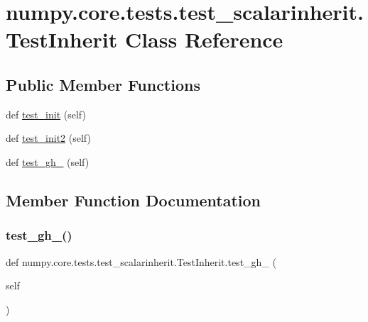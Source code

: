 \hypertarget{classnumpy_1_1core_1_1tests_1_1test__scalarinherit_1_1TestInherit}{}\section{numpy.\+core.\+tests.\+test\+\_\+scalarinherit.\+Test\+Inherit Class Reference}
\label{classnumpy_1_1core_1_1tests_1_1test__scalarinherit_1_1TestInherit}
\subsection*{Public Member Functions}
\begin{DoxyCompactItemize}
\item 
def \hyperlink{classnumpy_1_1core_1_1tests_1_1test__scalarinherit_1_1TestInherit_a812e7477531e852af7a5ef3efe48aa0d}{test\+\_\+init} (self)
\item 
def \hyperlink{classnumpy_1_1core_1_1tests_1_1test__scalarinherit_1_1TestInherit_a6f7c4a4280837ee396ca43188f6406a7}{test\+\_\+init2} (self)
\item 
def \hyperlink{classnumpy_1_1core_1_1tests_1_1test__scalarinherit_1_1TestInherit_ab98f29e81389bea89dc93fa30d704747}{test\+\_\+gh\+\_} (self)
\end{DoxyCompactItemize}


\subsection{Member Function Documentation}
\mbox{\label{classnumpy_1_1core_1_1tests_1_1test__scalarinherit_1_1TestInherit_ab98f29e81389bea89dc93fa30d704747}} 
\subsubsection{\texorpdfstring{test\+\_\+gh\+\_()}{test\_gh\_15395()}}
{\footnotesize\ttfamily def numpy.\+core.\+tests.\+test\+\_\+scalarinherit.\+Test\+Inherit.\+test\+\_\+gh\+\_ (\begin{DoxyParamCaption}\item[{}]{self }\end{DoxyParamCaption})}

